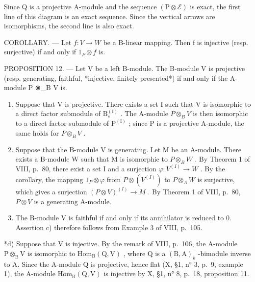 Since Q is a projective A-module and the sequence \((\mathrm{P} \otimes \mathcal{E})\) is exact, the first line of this diagram is an exact sequence. Since the vertical arrows are isomorphisms, the second line is also exact.

COROLLARY. --- Let \(f: V \rightarrow W\) be a B-linear mapping. Then f is injective (resp. surjective) if and only if \(1_{P} \otimes f\) is.

PROPOSITION 12. --- Let V be a left B-module. The B-module V is projective (resp. generating, faithful, *injective, finitely presented*) if and only if the A-module P ⊗\_B V is.

\begin{enumerate}
\def\labelenumi{\alph{enumi})}
\item
  Suppose that V is projective. There exists a set I such that V is isomorphic to a direct factor submodule of \(\mathrm{B}_{s}^{(\mathrm{I})}\) . The A-module \(P \otimes_{B} V\) is then isomorphic to a direct factor submodule of \(\mathrm{P}^{(\mathrm{I})}\) ; since P is a projective A-module, the same holds for \(P \otimes_{B} V\) .
\item
  Suppose that the B-module V is generating. Let M be an A-module. There exists a B-module W such that M is isomorphic to \(P \otimes_{B} W\) . By Theorem 1 of VIII, p.~80, there exist a set I and a surjection \(\varphi : V^{(I)} \to W\) . By the corollary, the mapping \(1_{P} \otimes \varphi\) from \(P \otimes (V^{(I)})\) to \(P \otimes_{A} W\) is surjective, which gives a surjection \((P \otimes V)^{(I)} \to M\) . By Theorem 1 of VIII, p.~80, \(P \otimes V\) is a generating A-module.
\item
  The B-module V is faithful if and only if its annihilator is reduced to 0. Assertion c) therefore follows from Example 3 of VIII, p.~105.
\end{enumerate}

*d) Suppose that V is injective. By the remark of VIII, p.~106, the A-module \(\mathrm{P} \otimes_{\mathrm{B}} \mathrm{V}\) is isomorphic to \(\mathrm{Hom}_{\mathrm{B}}(\mathrm{Q}, \mathrm{V})\) , where Q is a \((\mathrm{B}, \mathrm{A})_k\) -bimodule inverse to A. Since the A-module Q is projective, hence flat (X, §1, n° 3, p.~9, example 1), the A-module \(\mathrm{Hom}_{\mathrm{B}}(\mathrm{Q}, \mathrm{V})\) is injective by X, §1, n° 8, p.~18, proposition 11.

